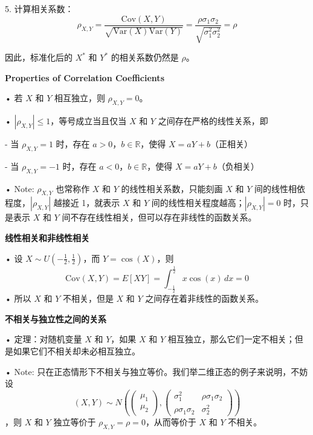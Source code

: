 \documentclass[UTF8]{report}
\theoremstyle{MyLineTheoremStyle} %
\theoremstyle{MyBlockTheoremStyle} %
\theoremstyle{MySubsubsectionStyle} %
\begin{document}
5. 计算相关系数：
\[
\rho_{X,Y} = \frac{\text{Cov}(X, Y)}{\sqrt{\text{Var}(X) \text{Var}(Y)}} = \frac{\rho \sigma_1 \sigma_2}{\sqrt{\sigma_1^2 \sigma_2^2}} = \rho
\]

因此，标准化后的 $X^*$ 和 $Y^*$ 的相关系数仍然是 $\rho$。

\vspace{1cm}

\textbf{Properties of Correlation Coefficients}\par
• 若 $X$ 和 $Y$ 相互独立，则 $\rho_{X,Y} = 0$。\par
• $|\rho_{X,Y}| \leq 1$，等号成立当且仅当 $X$ 和 $Y$ 之间存在严格的线性关系，即\par
  - 当 $\rho_{X,Y} = 1$ 时，存在 $a > 0$，$b \in \mathbb{R}$，使得 $X = aY + b$（正相关）\par
  - 当 $\rho_{X,Y} = -1$ 时，存在 $a < 0$，$b \in \mathbb{R}$，使得 $X = aY + b$（负相关）\par
• Note: $\rho_{X,Y}$ 也常称作 $X$ 和 $Y$ 的线性相关系数，只能刻画 $X$ 和 $Y$ 间的线性相依程度，$|\rho_{X,Y}|$ 越接近 1，就表示 $X$ 和 $Y$ 间的线性相关程度越高；$|\rho_{X,Y}| = 0$ 时，只是表示 $X$ 和 $Y$ 间不存在线性相关，但可以存在非线性的函数关系。\par

\vspace{1cm}

\textbf{线性相关和非线性相关}\par
• 设 $X \sim U\left(-\frac{1}{2}, \frac{1}{2}\right)$，而 $Y = \cos(X)$，则
\[
\text{Cov}(X, Y) = E[XY] = \int_{-\frac{1}{2}}^{\frac{1}{2}} x \cos(x) \, dx = 0
\]
• 所以 $X$ 和 $Y$ 不相关，但是 $X$ 和 $Y$ 之间存在着非线性的函数关系。\par

\vspace{1cm}

\textbf{不相关与独立性之间的关系}\par
• 定理：对随机变量 $X$ 和 $Y$，如果 $X$ 和 $Y$ 相互独立，那么它们一定不相关；但是如果它们不相关却未必相互独立。\par
• Note: 只在正态情形下不相关与独立等价。我们举二维正态的例子来说明，不妨设 
\[
(X, Y) \sim N\left(\begin{pmatrix} \mu_1 \\ \mu_2 \end{pmatrix}, \begin{pmatrix} \sigma_1^2 & \rho \sigma_1 \sigma_2 \\ \rho \sigma_1 \sigma_2 & \sigma_2^2 \end{pmatrix}\right)
\]
，则 $X$ 和 $Y$ 独立等价于 $\rho_{X,Y} = \rho = 0$，从而等价于 $X$ 和 $Y$ 不相关。\par
\end{document}
